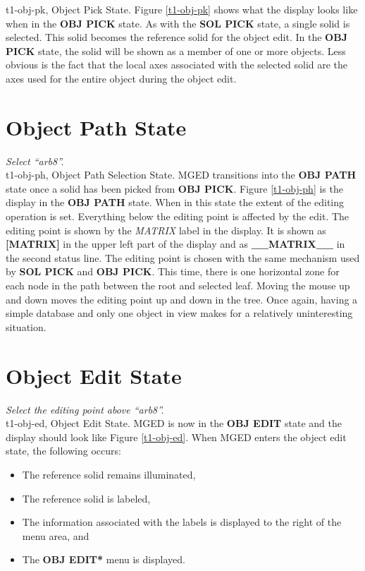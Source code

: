 \mfig t1-obj-pk, Object Pick State.
Figure \ref{t1-obj-pk} shows what the display looks like when in the
{\bf OBJ PICK} state. As with the {\bf SOL PICK} state, a single solid is
selected.  This solid becomes the reference solid for the object edit.
In the {\bf OBJ PICK} state, the solid will be shown
as a member of one or more objects.  Less obvious is the fact that the
local axes associated with the selected solid are the axes used for the
entire object during the object edit.

\section{Object Path State}

\noindent
{\em Select ``arb8''.}\\

\mfig t1-obj-ph, Object Path Selection State.
MGED transitions into the {\bf OBJ PATH} state once a solid has been
picked from {\bf OBJ PICK}. Figure \ref{t1-obj-ph} is the display in
the {\bf OBJ PATH} state.  When in this state the extent of the editing
operation is set.  Everything below the editing point is affected by the
edit.  The editing point is shown by the {\sl MATRIX} label in the
display.  It is shown as {\bf [MATRIX]} in the upper left part of the
display and as {\bf \_\_MATRIX\_\_} in the second status line.  The editing
point is chosen with the same mechanism used by {\bf SOL PICK} and
{\bf OBJ PICK}.  This time, there is one horizontal zone for each node in
the path between the root and selected leaf.  Moving the mouse up and down
moves the editing point up and down in the tree.  Once again, having a
simple database and only one object in view makes for a relatively
uninteresting situation.

\section{Object Edit State}

\noindent
{\em Select the editing point above ``arb8''.}\\

\mfig t1-obj-ed, Object Edit State.
MGED is now in the {\bf OBJ EDIT} state and the display should look like
Figure \ref{t1-obj-ed}.
When MGED enters the object edit state, the following occurs:
\begin{itemize}
\item The reference solid remains illuminated,
\item The reference solid is labeled,
\item The information associated with the labels is displayed to the right
of the menu area, and
\item The {\bf *OBJ EDIT*} menu is displayed.
\end{itemize}

